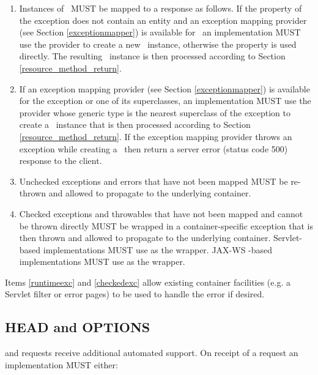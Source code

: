 \begin{enumerate}
\item Instances of \WebAppExc\ MUST be mapped to a response as follows. If the  property of the exception does not contain an entity and an exception mapping provider (see Section \ref{exceptionmapper}) is available for \WebAppExc\, an implementation MUST use the provider to create a new \Response\ instance, otherwise the  property is used directly. The resulting \Response\ instance is then processed according to Section \ref{resource_method_return}.
\item If an exception mapping provider (see Section \ref{exceptionmapper}) is available for the exception or one of its superclasses, an implementation MUST use the provider whose generic type is the nearest superclass of the exception to create a \Response\ instance that is then processed according to Section \ref{resource_method_return}. If the exception mapping provider throws an exception while creating a \Response\ then return a server error (status code 500) response to the client.
\item\label{runtimeexc} Unchecked exceptions and errors that have not been mapped MUST be re-thrown and allowed to propagate to the underlying container.
\item\label{checkedexc} Checked exceptions and throwables that have not been mapped and cannot be thrown directly MUST be wrapped in a container-specific exception that is then thrown and allowed to propagate to the underlying container. Servlet-based implementations MUST use  as the wrapper. JAX-WS -based implementations MUST use  as the wrapper.
\end{enumerate}

\begin{nnnote}Items \ref{runtimeexc} and \ref{checkedexc} allow existing container facilities (e.g. a Servlet filter or error pages) to be used to handle the error if desired.\end{nnnote}

\subsection{HEAD and OPTIONS}
\label{head_and_options}

 and  requests receive additional automated support. On receipt of a  request an implementation MUST either:

